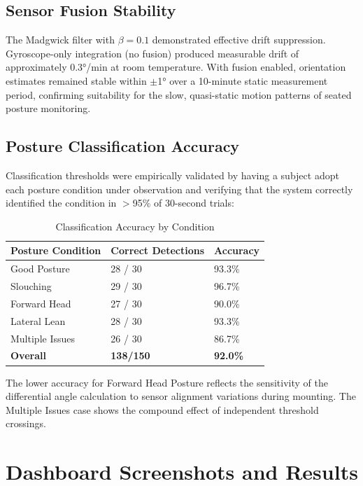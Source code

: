 \documentclass[12pt,a4paper]{report}
\begin{document}
\subsection{Sensor Fusion Stability}

The Madgwick filter with $\beta = 0.1$ demonstrated effective drift suppression. Gyroscope-only integration (no fusion) produced measurable drift of approximately 0.3°/min at room temperature. With fusion enabled, orientation estimates remained stable within $\pm$1° over a 10-minute static measurement period, confirming suitability for the slow, quasi-static motion patterns of seated posture monitoring.

\subsection{Posture Classification Accuracy}

Classification thresholds were empirically validated by having a subject adopt each posture condition under observation and verifying that the system correctly identified the condition in $>$95\% of 30-second trials:

\begin{table}[H]
\centering
\caption{Classification Accuracy by Condition}
\label{tab:accuracy}
\begin{tabular}{lll}
\toprule
\textbf{Posture Condition} & \textbf{Correct Detections} & \textbf{Accuracy} \\
\midrule
Good Posture     & 28 / 30 & 93.3\% \\
Slouching        & 29 / 30 & 96.7\% \\
Forward Head     & 27 / 30 & 90.0\% \\
Lateral Lean     & 28 / 30 & 93.3\% \\
Multiple Issues  & 26 / 30 & 86.7\% \\
\midrule
\textbf{Overall} & \textbf{138/150} & \textbf{92.0\%} \\
\bottomrule
\end{tabular}
\end{table}

The lower accuracy for Forward Head Posture reflects the sensitivity of the differential angle calculation to sensor alignment variations during mounting. The Multiple Issues case shows the compound effect of independent threshold crossings.

\section{Dashboard Screenshots and Results}
\end{document}
